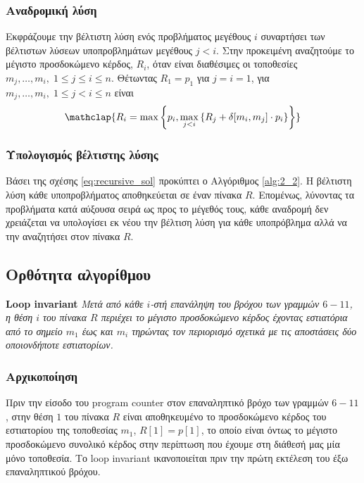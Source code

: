 	\subsubsection{Αναδρομική λύση}

		Εκφράζουμε την βέλτιστη λύση ενός προβλήματος μεγέθους $i$ συναρτήσει των βέλτιστων λύσεων υποπροβλημάτων μεγέθους $j<i$. Στην προκειμένη αναζητούμε το μέγιστο προσδοκώμενο κέρδος, $R_i$, όταν είναι διαθέσιμες οι τοποθεσίες $m_j,\ldots,m_i,\;1\leqslant j\leqslant i\leqslant n$. Θέτωντας $R_1=p_1$ για $j=i=1$, για $m_j,\ldots,m_i,\;1\leqslant j<i\leqslant n$ είναι
		\begin{equation}
			\label{eq:recursive_sol}
			\mathclap{R_i=\max{\left\{p_i,\max_{j<i}{\left\{R_j+\delta[m_i,m_j]\cdot p_i\right\}}\right\}}}
		\end{equation}

	\subsubsection{Υπολογισμός βέλτιστης λύσης}

		Βάσει της σχέσης \eqref{eq:recursive_sol} προκύπτει ο Αλγόριθμος \ref{alg:2_2}. Η βέλτιστη λύση κάθε υποπροβλήματος αποθηκεύεται σε έναν πίνακα $R$. Επομένως, λύνοντας τα προβλήματα κατά αύξουσα σειρά ως προς το μέγεθός τους, κάθε αναδρομή δεν χρειάζεται να υπολογίσει εκ νέου την βέλτιση λύση για κάθε υποπρόβλημα αλλά να την αναζητήσει στον πίνακα $R$.\par

        

\subsection{Ορθότητα αλγορίθμου}

		\noindent\textbf{Loop invariant }\textsl{ Μετά από κάθε $i$-στή επανάληψη του βρόχου των γραμμών $6-11$, η θέση $i$ του πίνακα $R$ περιέχει το μέγιστο προσδοκώμενο κέρδος έχοντας εστιατόρια από το σημείο $m_1$ έως και $m_i$ τηρώντας τον περιορισμό σχετικά με τις αποστάσεις δύο οποιονδήποτε εστιατορίων.}\par

		\subsubsection{Αρχικοποίηση}

			Πριν την είσοδο του program counter στον επαναληπτικό βρόχο των γραμμών $6-11$, στην θέση $1$ του πίνακα $R$ είναι αποθηκευμένο το προσδοκώμενο κέρδος του εστιατορίου της τοποθεσίας $m_1$, $R[1]=p[1]$, το οποίο είναι όντως το μέγιστο προσδοκώμενο συνολικό κέρδος στην περίπτωση που έχουμε στη διάθεσή μας μία μόνο τοποθεσία. Το loop invariant ικανοποιείται πριν την πρώτη εκτέλεση του έξω επαναληπτικού βρόχου.

